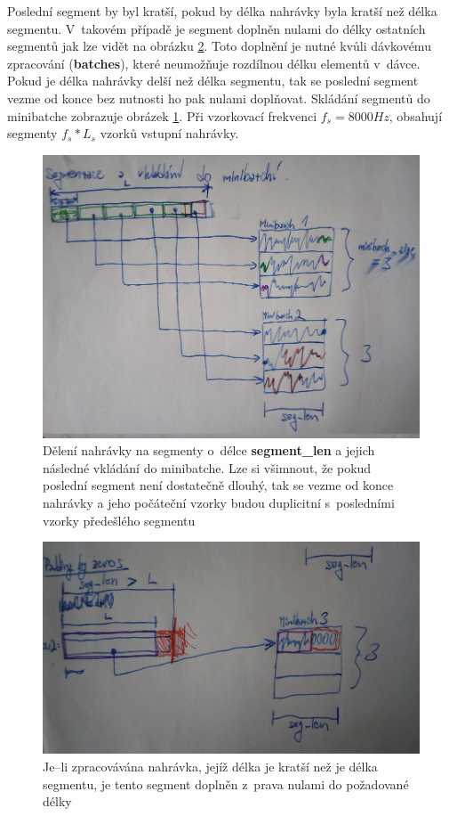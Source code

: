 Poslední segment by byl kratší, pokud by délka nahrávky byla kratší než délka segmentu. V~takovém případě je segment doplněn nulami do délky ostatních segmentů jak lze vidět na obrázku \ref{fig:segmentace_padding}. Toto doplnění je nutné kvůli dávkovému zpracování (\textbf{batches}), které neumožňuje rozdílnou délku elementů v~dávce. Pokud je délka nahrávky delší než délka segmentu, tak se poslední segment vezme od konce bez nutnosti ho pak nulami doplňovat. Skládání segmentů do minibatche zobrazuje obrázek \ref{fig:minibatch_segmentace}. Při vzorkovací frekvenci $f_s = 8000Hz$, obsahují segmenty $f_s * L_s$ vzorků vstupní nahrávky. 

\begin{figure}[H]
    \centering
    \includegraphics[scale=0.30]{obrazky-figures/minibatch_segmentace.jpg}
    \caption{\label{fig:minibatch_segmentace}Dělení nahrávky na segmenty o~délce \textbf{segment\_len} a jejich následné vkládání do minibatche. Lze si všimnout, že pokud poslední segment není dostatečně dlouhý, tak se vezme od konce nahrávky a jeho počáteční vzorky budou duplicitní s~posledními vzorky předešlého segmentu}
\end{figure}

\begin{figure}[H]
    \centering
    \includegraphics[scale=0.30]{obrazky-figures/minibatch_segmentace_padding.jpg}
    \caption{\label{fig:segmentace_padding}Je--li zpracovávána nahrávka, jejíž délka je kratší než je délka segmentu, je tento segment doplněn z~prava nulami do požadované délky}
\end{figure}

